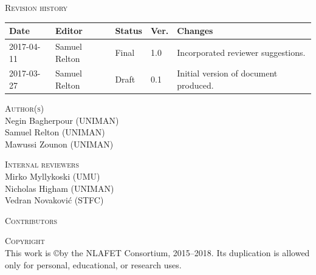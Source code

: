 \documentclass[a4paper,12pt]{article}
\begin{document}
\vspace{2em}




\noindent
\textsc{Revision history}\\[1em]
\begin{tabularx}{\linewidth}{@{}|l|l|l|l|X|}
  \hline
  \rowcolor{orange}
  \bf Date & \bf Editor & \bf Status & \bf Ver. & \bf Changes \\
  \hline
  2017-04-11 & Samuel Relton & Final & 1.0 & Incorporated reviewer suggestions.\\
  2017-03-27 & Samuel Relton & Draft & 0.1 & Initial version of
                                             document produced. \\
  \hline
\end{tabularx}

\vspace{2em}




\noindent
\textsc{Author(s)}\\[1em]
Negin Bagherpour (UNIMAN)\\
Samuel Relton (UNIMAN)\\
Mawussi Zounon (UNIMAN)

\vspace{2em}

\noindent
\textsc{Internal reviewers}\\[1em]
Mirko Myllykoski (UMU)\\
Nicholas Higham (UNIMAN)\\
Vedran Novakovi\'{c} (STFC)

\vspace{2em}


\noindent
\textsc{Contributors}\\[1em]

\vspace{2em}





\noindent
\textsc{Copyright}\\[1em]
This work is \copyright by the NLAFET Consortium, 2015--2018.
Its duplication is allowed only for personal, educational, or research uses.

\vspace{2em}
\end{document}
